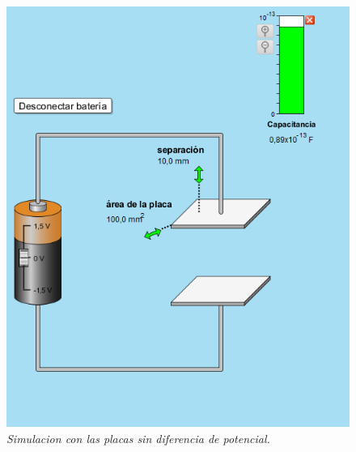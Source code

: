 \documentclass[12pt]{report}
\begin{document}
\begin{enumerate}
    
      \begin{figure}[h]
          \centering
          \begin{minipage}[h]{0.45\textwidth}
          \centering
          \includegraphics[width=1\textwidth]{./images/1FOTO1.png}
          \textit{Simulacion con las placas sin diferencia de potencial.} 
          \end{minipage}\hskip 1cm
          \begin{minipage}[h]{0.45\textwidth}
          \centering

\end{minipage}
\end{figure}
\end{enumerate}
\end{document}
